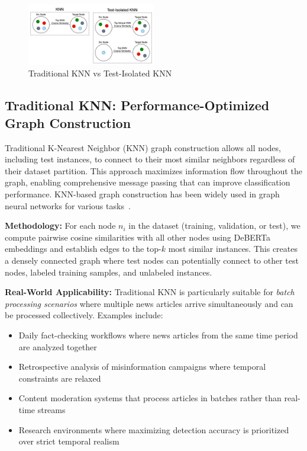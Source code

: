 \begin{figure}[h]
    \centering
    \includegraphics[width=0.5\textwidth]{context/methodology/fig/edge_construction.png}
    \caption{Traditional KNN vs Test-Isolated KNN}
    \label{fig:edge_construction}
\end{figure}

\subsection{Traditional KNN: Performance-Optimized Graph Construction}

Traditional K-Nearest Neighbor (KNN) graph construction allows all nodes, including test instances, to connect to their most similar neighbors regardless of their dataset partition. This approach maximizes information flow throughout the graph, enabling comprehensive message passing that can improve classification performance. KNN-based graph construction has been widely used in graph neural networks for various tasks~\cite{kipf2017semi, hamilton2017inductive}.

\textbf{Methodology:} For each node $n_i$ in the dataset (training, validation, or test), we compute pairwise cosine similarities with all other nodes using DeBERTa embeddings and establish edges to the top-$k$ most similar instances. This creates a densely connected graph where test nodes can potentially connect to other test nodes, labeled training samples, and unlabeled instances.

\textbf{Real-World Applicability:} Traditional KNN is particularly suitable for \emph{batch processing scenarios} where multiple news articles arrive simultaneously and can be processed collectively. Examples include:
\begin{itemize}
    \item Daily fact-checking workflows where news articles from the same time period are analyzed together
    \item Retrospective analysis of misinformation campaigns where temporal constraints are relaxed
    \item Content moderation systems that process articles in batches rather than real-time streams
    \item Research environments where maximizing detection accuracy is prioritized over strict temporal realism
\end{itemize}

